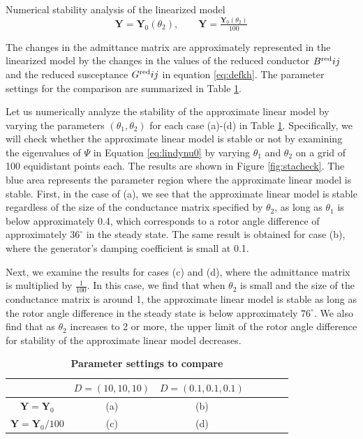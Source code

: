 \documentclass[graybox, envcountchap]{svmult}
\begin{document}
\begin{example}{Numerical stability analysis of the linearized model}
\begin{equation*}
  \bm{Y} = \bm{Y}_0(\theta_2)
  ,\qquad
  \bm{Y} = \tfrac{\bm{Y}_0(\theta_2)}{100}
\end{equation*}

The changes in the admittance matrix are approximately represented in the
linearized model by the changes in the values of the reduced conductor $B^{\rm
red}{ij}$ and the reduced susceptance $G^{\rm red}{ij}$ in equation
\ref{eq:defkh}. The parameter settings for the comparison are summarized in
Table \ref{table:parasetcom}.

Let us numerically analyze the stability of the approximate linear model by
varying the parameters $(\theta_1, \theta_2)$ for each case (a)-(d) in Table
\ref{table:parasetcom}. Specifically, we will check whether the approximate
linear model is stable or not by examining the eigenvalues of $\Psi$ in Equation
\ref{eq:lindynu0} by varying $\theta_1$ and $\theta_2$ on a grid of 100
equidistant points each. The results are shown in Figure \ref{fig:stacheck}. The
blue area represents the parameter region where the approximate linear model is
stable. First, in the case of (a), we see that the approximate linear model is
stable regardless of the size of the conductance matrix specified by $\theta_2$,
as long as $\theta_1$ is below approximately 0.4, which corresponds to a rotor
angle difference of approximately $36^\circ$ in the steady state. The same
result is obtained for case (b), where the generator's damping coefficient is
small at 0.1.

Next, we examine the results for cases (c) and (d), where the admittance matrix
is multiplied by $\tfrac{1}{100}$. In this case, we find that when $\theta_2$
is small and the size of the conductance matrix is around 1, the approximate
linear model is stable as long as the rotor angle difference in the steady state
is below approximately $76^\circ$. We also find that as $\theta_2$ increases to
2 or more, the upper limit of the rotor angle difference for stability of the
approximate linear model decreases.
\end{example}

\begin{table}[ht]
\medskip
 \caption{\textbf{Parameter settings to compare}}
 \label{table:parasetcom}
 \centering
  \begin{tabular}{|c|c|c|c|c|c|c|}
   \hline
 &    $D=(10,10,10)$ &   $D=(0.1,0.1,0.1)$ \\
   \hline 
 $\bm{Y} =\bm{Y}_0$ & (a) & (b) \\
   \hline
 $\bm{Y} = \bm{Y}_0/100  $  & (c) & (d) \\
   \hline
  \end{tabular}
\end{table}
\end{document}
